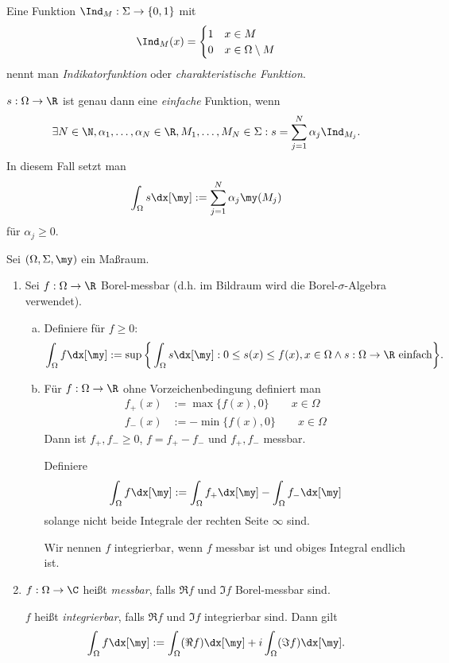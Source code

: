 \begin{df*}
	Eine Funktion $\Ind_M: \Sigma \to \{0,1\}$ mit
	\[
		\Ind_M (x) = \begin{cases}
			1 & x\in M \\
			0 & x \in \Omega \setminus M
		\end{cases}
	\]
	nennt man \emph{Indikatorfunktion} oder \emph{charakteristische Funktion}.

	$s:\Omega \to \R$ ist genau dann eine \emph{einfache} Funktion, wenn
	\[
		\exists N \in \N, \alpha_1, \dotsc, \alpha_N \in \R, M_1, \dotsc, M_N \in \Sigma : s = \sum_{j=1}^N \alpha_j \Ind_{M_j}.
	\]
	In diesem Fall setzt man
	\[
		\int_{\Omega} s \dx[\my] := \sum_{j=1}^N \alpha_j \my(M_j)
	\]
	für $\alpha_j \ge 0$.
\end{df*}

\begin{df}
	Sei $(\Omega, \Sigma, \my)$ ein Maßraum.
	
	\begin{enumerate}[1)]
		\item
			Sei $f: \Omega \to \R$ Borel-messbar (d.h. im Bildraum wird die Borel-$\sigma$-Algebra verwendet).

			\begin{enumerate}[a)]
				\item
					Definiere für $f \ge 0$:
					\[
						\int_{\Omega} f \dx[\my] 
						:= \sup \bigg\{ \int_{\Omega} s \dx[\my] : 0 \le s(x) \le f(x), x \in \Omega \land s : \Omega \to \R \text{ einfach} \bigg\}.
					\]
				\item
					Für $f: \Omega \to \R$ ohne Vorzeichenbedingung definiert man
					\begin{align*}
						f_+ (x) &:= \max\{f(x), 0 \} \qquad x \in \Omega \\
						f_- (x) &:= -\min\{ f(x), 0 \} \qquad x \in \Omega
					\end{align*}
					Dann ist $f_+, f_- \ge 0$, $f = f_+ - f_-$ und $f_+, f_-$ messbar.
					
					Definiere
					\[
						\int_{\Omega} f \dx[\my] := \int_{\Omega} f_+ \dx[\my] - \int_{\Omega} f_- \dx[\my]
					\]
					solange nicht beide Integrale der rechten Seite $\infty$ sind.

					Wir nennen $f$ integrierbar, wenn $f$ messbar ist und obiges Integral endlich ist.
			\end{enumerate}
		\item
			$f : \Omega \to \C$ heißt \emph{messbar}, falls $\Re f$ und $\Im f$ Borel-messbar sind.

			$f$ heißt \emph{integrierbar}, falls $\Re f$ und $\Im f$ integrierbar sind. 
			Dann gilt
			\[
				\int_{\Omega} f \dx[\my] := \int_{\Omega} (\Re f) \dx[\my] + i \int_{\Omega} (\Im f) \dx[\my] .
			\]
	\end{enumerate}

\end{df}
	

